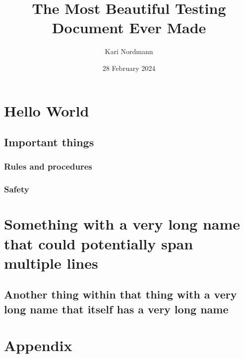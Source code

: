 \documentclass[sansheadings]{ooga-booga}
\title{The Most Beautiful Testing Document Ever Made}
\author{Kari Nordmann}
\date{28 February 2024}
\begin{document}
\frontmatter

\maketitle

\begin{preface}[Abstract]

\lipsum[40-41]

\end{preface}

\tableofcontents

\mainmatter

\chapter{Hello World}

\lipsum[1-2]

\section{Important things}

\subsection{Rules and procedures}

\lipsum[3-8]

\subsection{Safety}

\lipsum[9-12]

\chapter{Something with a very long name that could potentially span multiple lines}

\section{Another thing within that thing with a very long name that itself has a very long name}

\lipsum[13-15]

\backmatter

\chapter{Appendix}

\lipsum[20-22]
\end{document}
